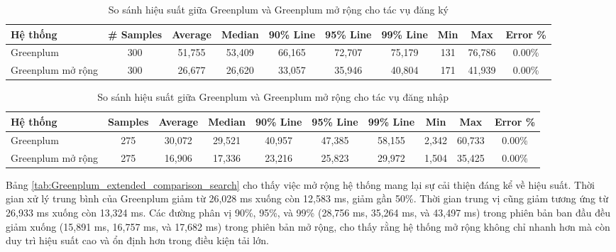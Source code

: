 \begin{table}[htbp]
\centering
\renewcommand{\arraystretch}{1.2} %
\setlength{\tabcolsep}{2pt} %
\begin{tabular}{|l|c|c|c|c|c|c|c|c|c|}
\hline
\textbf{Hệ thống} & \textbf{\# Samples} & \textbf{Average} & \textbf{Median} & \textbf{90\% Line} & \textbf{95\% Line} & \textbf{99\% Line} & \textbf{Min} & \textbf{Max} & \textbf{Error \%} \\ \hline
Greenplum & 300 & 51,755 & 53,409 & 66,165 & 72,707 & 75,179 & 131 & 76,786 & 0.00\% \\ \hline
Greenplum mở rộng & 300 & 26,677 & 26,620 & 33,057 & 35,946 & 40,804 & 171 & 41,939 & 0.00\% \\ \hline
\end{tabular}
\caption{So sánh hiệu suất giữa Greenplum và Greenplum mở rộng cho tác vụ đăng ký}
\label{tab:Greenplum_extended_comparison_registation}
\end{table}

\begin{table}[htbp]
\centering
\renewcommand{\arraystretch}{1.2} %
\setlength{\tabcolsep}{3.5pt} %
\begin{tabular}{|l|c|c|c|c|c|c|c|c|c|}
\hline
\textbf{Hệ thống} & \textbf{Samples} & \textbf{Average} & \textbf{Median} & \textbf{90\% Line} & \textbf{95\% Line} & \textbf{99\% Line} & \textbf{Min} & \textbf{Max} & \textbf{Error \%} \\ \hline
Greenplum & 275 & 30,072 & 29,521 & 40,957 & 47,385 & 58,155 & 2,342 & 60,733 & 0.00\% \\ \hline
Greenplum mở rộng & 275 & 16,906 & 17,336 & 23,216 & 25,823 & 29,972 & 1,504 & 35,425 & 0.00\% \\ \hline
\end{tabular}
\caption{So sánh hiệu suất giữa Greenplum và Greenplum mở rộng cho tác vụ đăng nhập}
\label{tab:Greenplum_extended_comparison_login}
\end{table}



Bảng \ref{tab:Greenplum_extended_comparison_search} cho thấy việc mở rộng hệ thống mang lại sự cải thiện đáng kể về hiệu suất. Thời gian xử lý trung bình của Greenplum giảm từ 26,028 ms xuống còn 12,583 ms, giảm gần 50\%. Thời gian trung vị cũng giảm tương ứng từ 26,933 ms xuống còn 13,324 ms. Các đường phân vị 90\%, 95\%, và 99\% (28,756 ms, 35,264 ms, và 43,497 ms) trong phiên bản ban đầu đều giảm xuống (15,891 ms, 16,757 ms, và 17,682 ms) trong phiên bản mở rộng, cho thấy rằng hệ thống mở rộng không chỉ nhanh hơn mà còn duy trì hiệu suất cao và ổn định hơn trong điều kiện tải lớn.

